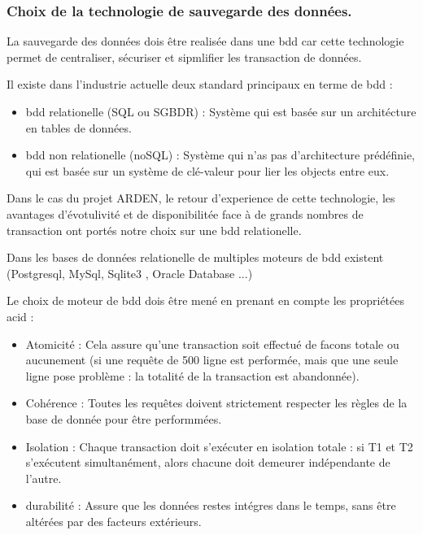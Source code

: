 \justify
\subsubsection{Choix de la technologie de sauvegarde des données.}

La sauvegarde des données dois être realisée dans une \gls{bdd} car cette technologie permet de centraliser, sécuriser et sipmlifier les transaction de données.

Il existe dans l'industrie actuelle deux standard principaux en terme de \gls{bdd} :
\begin{itemize}
    \item \gls{bdd} relationelle (SQL ou SGBDR) : Système qui est basée sur un architécture en tables de données.
    \item \gls{bdd} non relationelle (noSQL) : Système qui n'as pas d'architecture prédéfinie, qui est basée sur un système de clé-valeur pour lier les objects entre eux. \cite{BDD_theses}
\end{itemize}

Dans le cas du projet ARDEN, le retour d'experience de cette technologie, les avantages d'évotulivité et de disponibilitée face à de grands nombres de transaction ont portés notre choix sur une \gls{bdd} relationelle.

Dans les bases de données relationelle de multiples moteurs de \gls{bdd} existent (Postgresql, MySql, Sqlite3 , Oracle Database ...)

Le choix de moteur de \gls{bdd} dois être mené en prenant en compte les propriétées \gls{acid} :
\begin{itemize}
    \item Atomicité : Cela assure qu'une transaction soit effectué de facons totale ou aucunement (si une requête de 500 ligne est performée, mais que une seule ligne pose problème : la totalité de la transaction est abandonnée). 
    \item Cohérence : Toutes les requêtes doivent strictement respecter les règles de la base de donnée pour être performmées.
    \item Isolation : Chaque transaction doit s'exécuter en isolation totale : si T1 et T2 s'exécutent simultanément, alors chacune doit demeurer indépendante de l'autre. 
    \item durabilité : Assure que les données restes intégres dans le temps, sans être altérées par des facteurs extérieurs.
    \cite{wikipedia_acid}
\end{itemize}

